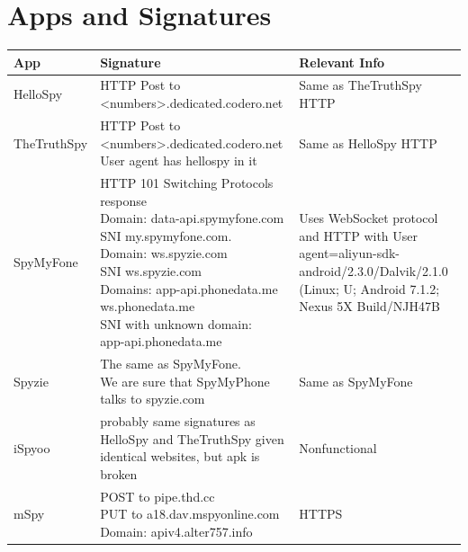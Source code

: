 \documentclass[acmtog]{acmart}
\begin{document}



\appendix
\clearpage
\begin{table}
\section{Apps and Signatures}
\begin{tabular}{p{5cm}p{5cm}p{5cm}}
	\toprule
	App & Signature & Relevant Info \\
	\midrule
	HelloSpy & \makecell{HTTP Post to\\ <numbers>.dedicated.codero.net} & Same as TheTruthSpy HTTP \\
	
	TheTruthSpy & \makecell{HTTP Post to\\ <numbers>.dedicated.codero.net\\ User agent has hellospy in it} & Same as HelloSpy HTTP \\
	
	SpyMyFone & \makecell{HTTP 101 Switching Protocols\\ response\\
	Domain: data-api.spymyfone.com\\SNI my.spymyfone.com.\\
	Domain: ws.spyzie.com\\SNI ws.spyzie.com\\
	Domains: app-api.phonedata.me\\ws.phonedata.me\\
	SNI with unknown domain:\\ app-api.phonedata.me} & Uses WebSocket protocol and HTTP with User agent=aliyun-sdk-android/2.3.0/Dalvik/2.1.0 (Linux; U; Android 7.1.2; Nexus 5X Build/NJH47B \\

	Spyzie & \makecell{The same as SpyMyFone.\\ We are sure that SpyMyPhone\\ talks to spyzie.com} & Same as SpyMyFone \\
	
	iSpyoo & probably same signatures as HelloSpy and TheTruthSpy given identical websites, but apk is broken & Nonfunctional \\
	
	mSpy & \makecell{POST to pipe.thd.cc\\
	PUT to a18.dav.mspyonline.com\\
	Domain: apiv4.alter757.info} & HTTPS \\
	

\end{tabular}
\end{table}
\end{document}
